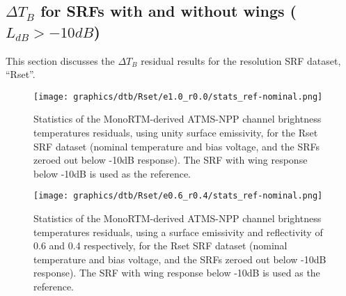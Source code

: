\subsection{$\Delta T_B$ for SRFs with and without wings ($L_{dB} > -10dB$)}
\label{sec:rt.Rset}
This section discusses the $\Delta T_B$ residual results for the resolution SRF dataset, ``Rset''.

\begin{figure}[H]
  \centering
    \texttt{[image: graphics/dtb/Rset/e1.0\_r0.0/stats\_ref-nominal.png]} 
  \caption{Statistics of the MonoRTM-derived ATMS-NPP channel brightness temperatures residuals, using unity surface emissivity, for the Rset SRF dataset (nominal temperature and bias voltage, and the SRFs zeroed out below -10dB response). The SRF with wing response below -10dB is used as the reference.}
  \label{fig:Rset_e1.0_r0.0_stats_ref-nominal}
\end{figure}

\begin{figure}[H]
  \centering
    \texttt{[image: graphics/dtb/Rset/e0.6\_r0.4/stats\_ref-nominal.png]} 
  \caption{Statistics of the MonoRTM-derived ATMS-NPP channel brightness temperatures residuals, using a surface emissivity and reflectivity of 0.6 and 0.4 respectively, for the Rset SRF dataset (nominal temperature and bias voltage, and the SRFs zeroed out below -10dB response). The SRF with wing response below -10dB is used as the reference.}
  \label{fig:Rset_e0.6_r0.4_stats_ref-nominal}
\end{figure}



